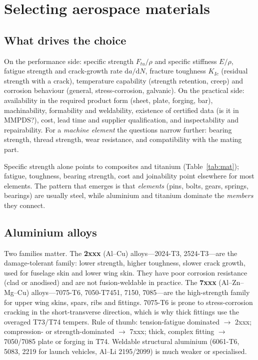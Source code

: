 \documentclass[11pt,a4paper]{article}
\begin{document}
\section{Selecting aerospace materials}

\subsection{What drives the choice}
On the performance side: specific strength $F_{tu}/\rho$ and specific stiffness $E/\rho$, fatigue strength and crack-growth rate $\mathrm da/\mathrm dN$, fracture toughness $K_{Ic}$ (residual strength with a crack), temperature capability (strength retention, creep) and corrosion behaviour (general, stress-corrosion, galvanic). On the practical side: availability in the required product form (sheet, plate, forging, bar), machinability, formability and weldability, existence of certified data (is it in MMPDS?), cost, lead time and supplier qualification, and inspectability and repairability. For a \emph{machine element} the questions narrow further: bearing strength, thread strength, wear resistance, and compatibility with the mating part.

Specific strength alone points to composites and titanium (Table~\ref{tab:mat}); fatigue, toughness, bearing strength, cost and joinability point elsewhere for most elements. The pattern that emerges is that \emph{elements} (pins, bolts, gears, springs, bearings) are usually steel, while aluminium and titanium dominate the \emph{members} they connect.

\subsection{Aluminium alloys}
Two families matter. The \textbf{2xxx} (Al--Cu) alloys---2024-T3, 2524-T3---are the damage-tolerant family: lower strength, higher toughness, slower crack growth, used for fuselage skin and lower wing skin. They have poor corrosion resistance (clad or anodised) and are not fusion-weldable in practice. The \textbf{7xxx} (Al--Zn--Mg--Cu) alloys---7075-T6, 7050-T7451, 7150, 7085---are the high-strength family for upper wing skins, spars, ribs and fittings. 7075-T6 is prone to stress-corrosion cracking in the short-transverse direction, which is why thick fittings use the overaged T73/T74 tempers. Rule of thumb: tension-fatigue dominated $\rightarrow$ 2xxx; compression- or strength-dominated $\rightarrow$ 7xxx; thick, complex fitting $\rightarrow$ 7050/7085 plate or forging in T74. Weldable structural aluminium (6061-T6, 5083, 2219 for launch vehicles, Al--Li 2195/2099) is much weaker or specialised.
\end{document}
